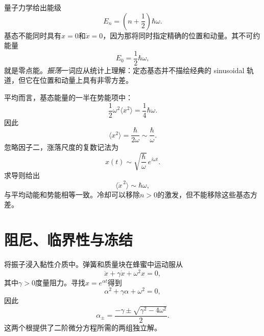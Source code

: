 量子力学给出能级
\begin{equation}
E_n=\left(n+\frac12\right)\hbar\omega.
\label{eq:c10-oscillator-levels}
\end{equation}
基态不能同时具有\(x=0\)和\(\dot x=0\)，因为那将同时指定精确的位置和动量。其不可约能量
\[
E_0=\frac12\hbar\omega,
\]
就是零点能。\emph{振荡}一词应从统计上理解：定态基态并不描绘经典的 sinusoidal 轨道，但它在位置和动量上具有非零方差。

平均而言，基态能量的一半在势能项中：
\[
\frac12\omega^2\langle x^2\rangle
=\frac14\hbar\omega.
\]
因此
\begin{equation}
\langle x^2\rangle=\frac{\hbar}{2\omega}
\sim\frac{\hbar}{\omega}.
\label{eq:c10-zero-point-position}
\end{equation}
忽略因子二，涨落尺度的复数记法为
\[
x(t)\sim\sqrt{\frac{\hbar}{\omega}}\,e^{i\omega t}.
\]
求导则给出
\begin{equation}
\langle\dot x^{\,2}\rangle\sim\hbar\omega,
\label{eq:c10-zero-point-velocity}
\end{equation}
与平均动能和势能相等一致。冷却可以移除\(n>0\)的激发，但不能移除这些基态方差。

\section{阻尼、临界性与冻结}

将振子浸入黏性介质中。弹簧和质量块在蜂蜜中运动服从
\begin{equation}
\ddot x+\gamma\dot x+\omega^2x=0,
\label{eq:c10-damped}
\end{equation}
其中\(\gamma>0\)度量阻力。寻找\(x=e^{\alpha t}\)得到
\begin{equation}
\alpha^2+\gamma\alpha+\omega^2=0,
\end{equation}
因此
\begin{equation}
\alpha_\pm
=\frac{-\gamma\pm\sqrt{\gamma^2-4\omega^2}}{2}.
\label{eq:c10-damped-roots}
\end{equation}
这两个根提供了二阶微分方程所需的两组独立解。

\begin{classroomqa}
\end{classroomqa}

